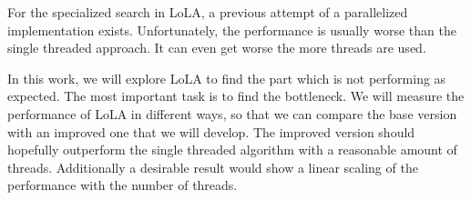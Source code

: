 For the specialized search in LoLA, a previous attempt of a parallelized implementation exists. Unfortunately, the performance is usually worse than the single threaded approach. It can even get worse the more threads are used.

In this work, we will explore LoLA to find the part which is not performing as expected. The most important task is to find the bottleneck. We will measure the performance of LoLA in different ways, so that we can compare the base version with an improved one that we will develop. The improved version should hopefully outperform the single threaded algorithm with a reasonable amount of threads. Additionally a desirable result would show a linear scaling of the performance with the number of threads.
